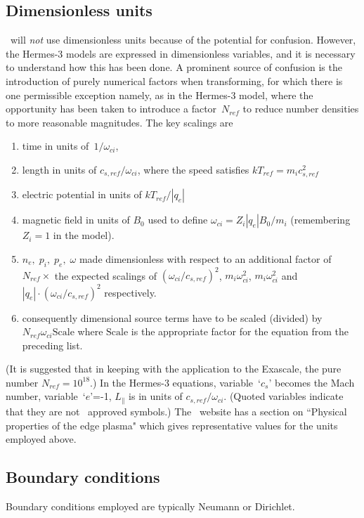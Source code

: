 \subsection{Dimensionless units}\label{sec:26dim}
\nep\ will \emph{not} use dimensionless units because of the potential for confusion. However, the Hermes-3
models are expressed in dimensionless variables, and it is necessary to understand how this has been done.
A prominent source of confusion is the introduction of purely numerical factors when transforming, for
which there is one permissible exception namely, as in the Hermes-3 model, where the opportunity has been taken
to introduce a factor~$N_{ref}$ to reduce number densities
to more reasonable magnitudes. The key scalings are
\begin{enumerate}
\item time in units of~$1/\omega_{ci}$, 
\item length in units of $c_{s,ref}/\omega_{ci}$, where the speed satisfies $kT_{ref}=m_i c_{s,ref}^2$
\item electric potential in units of $kT_{ref}/|q_e|$
\item magnetic field in units of $B_0$ used to define $\omega_{ci}=Z_i |q_e| B_0/m_i$ (remembering $Z_i=1$ in the model).
\item $n_e,\; p_i,\; p_e,\; \omega$ made dimensionless with respect to an additional factor of $N_{ref} \times$
the expected scalings of $(\omega_{ci}/c_{s,ref})^2$, $m_i\omega_{ci}^2$, $m_i\omega_{ci}^2$ and
$|q_e|\cdot (\omega_{ci}/c_{s,ref})^2$ respectively.
\item consequently dimensional source terms have to be scaled (divided) by $N_{ref} \omega_{ci} \mathrm{Scale}$
where $\mathrm{Scale}$ is the appropriate factor for the equation from the preceding list.
\end{enumerate}
(It is suggested that in keeping with the application to the Exascale, the pure number $N_{ref}=10^{18}$.)
In the Hermes-3 equations, variable~`$c_s$' becomes the Mach number, variable~`$e$'=-1,
$L_{\|}$ is in units of $c_{s,ref}/\omega_{ci}$. (Quoted variables
indicate that they are not \nep\ approved symbols.) The \nep\ website has a section on ``Physical properties of
the edge plasma" which gives representative values for the units employed above. 


\subsection{Boundary conditions}\label{sec:26bcs}
Boundary conditions employed are typically Neumann or Dirichlet.


